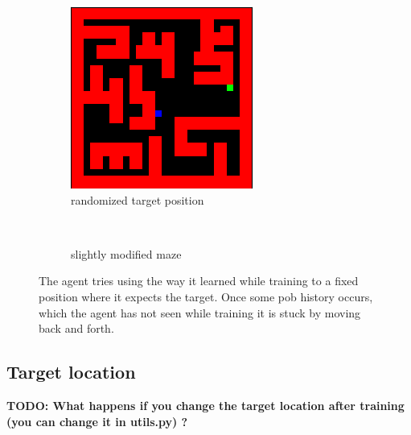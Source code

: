\documentclass[a4paper,14pt]{article}
\begin{document}
\begin{figure}
    \centering
    \begin{subfigure}[b]{0.3\textwidth}
        \includegraphics[width=\textwidth]{random_target}
        \caption{randomized target position}
        \label{fig:randomtargetmaze}
    \end{subfigure}
    ~ %
    \begin{subfigure}[b]{0.3\textwidth}
        \caption{slightly modified maze}
        \label{fig:othermaze}
    \end{subfigure}
    \caption{The agent tries using the way it learned while training to a fixed
      position where it expects the target. Once some pob history occurs, which the agent has
      not seen while training it is stuck by moving back and forth.}\label{fig:generalization}
\end{figure}

\subsection{Target location}
\textbf{TODO: What happens if you change the target location after training (you can
change it in utils.py) ?}
\end{document}
